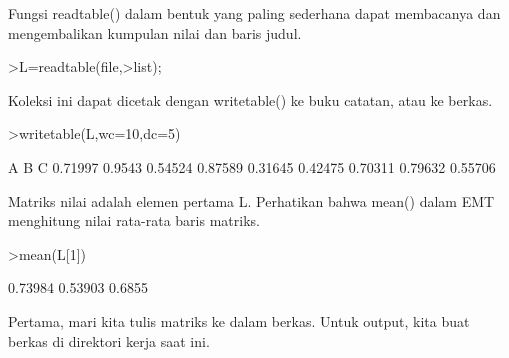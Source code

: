 \documentclass[a4paper,10pt]{article}
\begin{document}
\begin{eulernotebook}
\begin{eulercomment}
\begin{eulercomment}
\begin{eulercomment}
\begin{eulercomment}
\begin{eulercomment}
\begin{eulercomment}
\begin{eulercomment}
\begin{eulercomment}
\begin{eulercomment}
\begin{eulercomment}
\begin{eulercomment}
\begin{eulercomment}
\begin{eulercomment}
\begin{eulercomment}
\begin{eulercomment}
\begin{eulercomment}
\begin{eulercomment}
\begin{eulercomment}
\begin{eulercomment}
\begin{eulercomment}
\begin{eulercomment}
\begin{eulercomment}
\begin{eulercomment}
\begin{eulercomment}
\begin{eulercomment}
\begin{eulercomment}
\begin{eulercomment}
\begin{eulercomment}
\begin{eulercomment}
\begin{eulercomment}
\begin{eulercomment}
\begin{eulercomment}
\begin{eulercomment}
\begin{eulercomment}
\begin{eulercomment}
\begin{eulercomment}
\begin{euleroutput}
\end{euleroutput}
\begin{eulercomment}
Fungsi readtable() dalam bentuk yang paling sederhana dapat membacanya
dan mengembalikan kumpulan nilai dan baris judul.
\end{eulercomment}
\begin{eulerprompt}
>L=readtable(file,>list);
\end{eulerprompt}
\begin{eulercomment}
Koleksi ini dapat dicetak dengan writetable() ke buku catatan, atau ke
berkas.
\end{eulercomment}
\begin{eulerprompt}
>writetable(L,wc=10,dc=5)
\end{eulerprompt}
\begin{euleroutput}
           A         B         C
     0.71997    0.9543   0.54524
     0.87589   0.31645   0.42475
     0.70311   0.79632   0.55706
\end{euleroutput}
\begin{eulercomment}
Matriks nilai adalah elemen pertama L. Perhatikan bahwa mean() dalam
EMT menghitung nilai rata-rata baris matriks.
\end{eulercomment}
\begin{eulerprompt}
>mean(L[1])
\end{eulerprompt}
\begin{euleroutput}
    0.73984 
    0.53903 
     0.6855 
\end{euleroutput}
\begin{eulercomment}
Pertama, mari kita tulis matriks ke dalam berkas. Untuk output, kita
buat berkas di direktori kerja saat ini.
\end{eulercomment}
\begin{eulerprompt}

\end{eulerprompt}
\end{eulercomment}
\end{eulercomment}
\end{eulercomment}
\end{eulercomment}
\end{eulercomment}
\end{eulercomment}
\end{eulercomment}
\end{eulercomment}
\end{eulercomment}
\end{eulercomment}
\end{eulercomment}
\end{eulercomment}
\end{eulercomment}
\end{eulercomment}
\end{eulercomment}
\end{eulercomment}
\end{eulercomment}
\end{eulercomment}
\end{eulercomment}
\end{eulercomment}
\end{eulercomment}
\end{eulercomment}
\end{eulercomment}
\end{eulercomment}
\end{eulercomment}
\end{eulercomment}
\end{eulercomment}
\end{eulercomment}
\end{eulercomment}
\end{eulercomment}
\end{eulercomment}
\end{eulercomment}
\end{eulercomment}
\end{eulercomment}
\end{eulercomment}
\end{eulercomment}
\end{eulernotebook}
\end{document}

